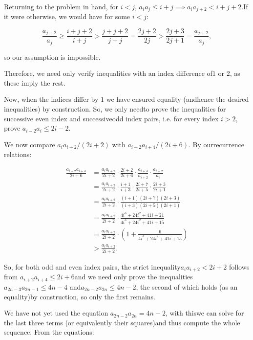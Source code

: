 \begin{enumerate}
 

 Returning to the problem in hand, for $i < j$, $a_ia_j \le i+j \implies a_ia_{j+2} < i+j+2$.If it were otherwise, we would have for some $i < j$:

 
 \[\frac{a_{j+2}}{a_j} \ge \frac{i+j+2}{i+j} > \frac{j+j+2}{j+j} = \frac{2j+2}{2j} > \frac{2j+3}{2j+1} = \frac{a_{j+2}}{a_j},\]

 

 so our assumption is impossible.

 Therefore, we need only verify inequalities with an index difference of$1$ or $2$, as these imply the rest.

 Now, when the indices differ by $1$ we have ensured equality (andhence the desired inequalities) by construction. So, we only needto prove the inequalities for successive even index and successiveodd index pairs, i.e. for every index $i > 2$, prove $a_{i-2}a_i \le 2i-2$.

 We now compare $a_ia_{i+2}/(2i+2)$ with $a_{i+2}a_{i+4}/(2i+6)$. By ourrecurrence relations:

 
 \begin{align*}   \frac{a_{i+2}a_{i+4}}{2i+6}     &= \frac{a_ia_{i+2}}{2i+2} \cdot          \frac{2i+2}{2i+6} \cdot          \frac{a_{i+4}}{a_{i+2}}\cdot          \frac{a_{i+2}}{a_i} \\     &= \frac{a_ia_{i+2}}{2i+2}\cdot          \frac{i+1}{i+3}\cdot          \frac{2i+7}{2i+5}\cdot          \frac{2i+3}{2i+1} \\     &= \frac{a_ia_{i+2}}{2i+2}\cdot          \frac{(i+1)(2i+7)(2i+3)}{(i+3)(2i+5)(2i+1)} \\     &= \frac{a_ia_{i+2}}{2i+2}\cdot          \frac{4i^3+24i^2+41i+21}{4i^3+24i^2+41i+15} \\     &= \frac{a_ia_{i+2}}{2i+2}\cdot          \left(1+\frac{6}{4i^3+24i^2+41i+15}\right) \\     &> \frac{a_ia_{i+2}}{2i+2}. \end{align*}


 

 So, for both odd and even index pairs, the strict inequality$a_ia_{i+2} < 2i+2$ follows from $a_{i+2}a_{i+4} \le 2i+6$and we need only prove the inequalities $a_{2n-3}a_{2n-1} \le 4n-4$ and$a_{2n-2}a_{2n} \le 4n-2$, the second of which holds (as an equality)by construction, so only the first remains.

 We have not yet used the equation $a_{2n-2}a_{2n} = 4n-2$, with thiswe can solve for the last three terms (or equivalently their squares)and thus compute the whole sequence. From the equations:


\end{enumerate}

